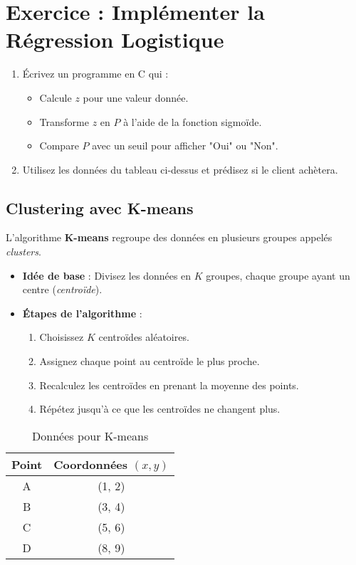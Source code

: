 \section*{Exercice : Implémenter la Régression Logistique}
\begin{enumerate}
	\item  Écrivez un programme en C qui :  
\begin{itemize}
	\item Calcule $z$ pour une valeur donnée.  
	\item Transforme $z$ en $P$ à l’aide de la fonction sigmoïde.  
	\item Compare $P$ avec un seuil pour afficher "Oui" ou "Non".  
\end{itemize}
\item Utilisez les données du tableau ci-dessus et prédisez si le client achètera.
\end{enumerate}

\subsection{Clustering avec K-means}
L’algorithme \textbf{K-means} regroupe des données en plusieurs groupes appelés \textit{clusters}.

\begin{itemize}
	\item \textbf{Idée de base} : Divisez les données en $K$ groupes, chaque groupe ayant un centre (\textit{centroïde}).
	\item \textbf{Étapes de l’algorithme} :
	\begin{enumerate}
		\item Choisissez $K$ centroïdes aléatoires.
		\item Assignez chaque point au centroïde le plus proche.
		\item Recalculez les centroïdes en prenant la moyenne des points.
		\item Répétez jusqu'à ce que les centroïdes ne changent plus.
	\end{enumerate}
\end{itemize}

\begin{table}[h]
	\centering
	\caption{Données pour K-means}
	\begin{tabular}{|c|c|}
		\hline
		Point & Coordonnées $(x, y)$ \\ \hline
		A     & (1, 2)              \\ \hline
		B     & (3, 4)              \\ \hline
		C     & (5, 6)              \\ \hline
		D     & (8, 9)              \\ \hline
	\end{tabular}
\end{table}

